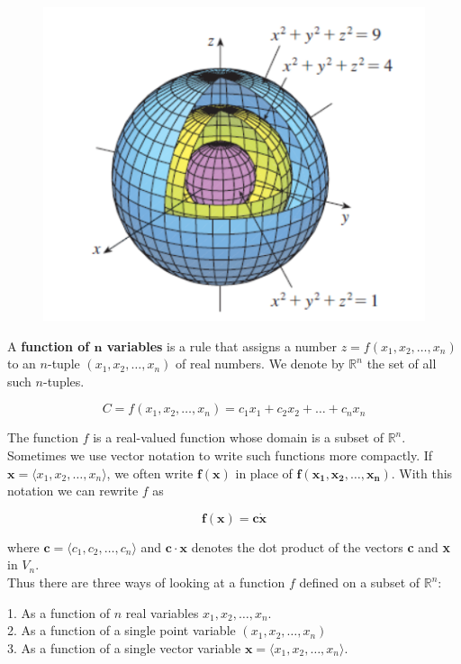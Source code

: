         \begin{figure}[hbt!]
            \centering
            \includegraphics[scale = 0.75]{Resources/14.1_Surfaces}
        \end{figure}

        A \textbf{function of $\mathbf{n}$ variables} is a rule that assigns a number $z=f(x_1, x_2, \dots, x_n)$ to an $n$-tuple $(x_1, x_2, \dots, x_n)$ of real numbers. We denote by $\mathbb{R}^n$ the set of all such
        $n$-tuples.

        \[
            C = f(x_1, x_2, \dots, x_n) = c_1 x_1 + c_2 x_2 + \dots + c_n x_n
        \]

        The function $f$ is a real-valued function whose domain is a subset of $\mathbb{R}^n$. Sometimes we use vector notation to write such functions more compactly. If $\mathbf{x} = \langle x_1, x_2, \dots, x_n\rangle$,
        we often write $\mathbf{f(x)}$ in place of $\mathbf{f(x_1, x_2, \dots, x_n)}$. With this notation we can rewrite $f$ as

        \[
            \mathbf{f(x) = c\dot x}
        \]

        where $\mathbf{c} = \langle c_1, c_2, \dots, c_n\rangle$ and $\mathbf{c\cdot x}$ denotes the dot product of the vectors \textbf{c} and \textbf{x} in $V_n$. \\

        Thus there are three ways of looking at a function $f$ defined on a subset of $\mathbb{R}^n$:

        1. As a function of $n$ real variables $x_1, x_2, \dots, x_n$. \\
        2. As a function of a single point variable $(x_1, x_2, \dots, x_n)$ \\
        3. As a function of a single vector variable $\mathbf{x} = \langle x_1, x_2, \dots, x_n\rangle$.

